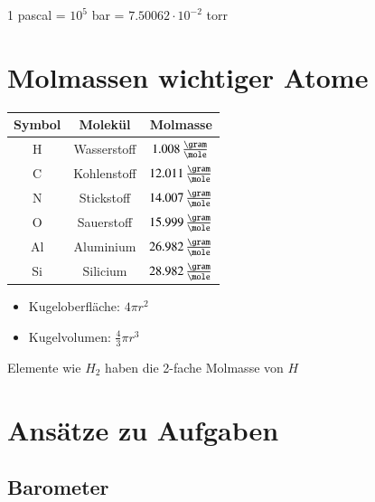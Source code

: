 1 pascal = $10^5$ bar = $7.50062 \cdot 10^{-2}$ torr

\section{Molmassen wichtiger Atome}
\begin{minipage}{0.5\columnwidth}
    \renewcommand{\arraystretch}{1.3}
    \begin{tabular}{c | c | c }
        \textbf{Symbol} & \textbf{Molekül}  & \textbf{Molmasse}                 \\
        \hline
        H               & Wasserstoff       & $1.008 \, \frac{\gram}{\mole}$    \\
        C               & Kohlenstoff       & $12.011 \, \frac{\gram}{\mole}$   \\
        N               & Stickstoff        & $14.007 \, \frac{\gram}{\mole}$   \\
        O               & Sauerstoff        & $15.999 \, \frac{\gram}{\mole}$   \\
        Al              & Aluminium         & $26.982 \, \frac{\gram}{\mole}$   \\
        Si              & Silicium          & $28.982 \, \frac{\gram}{\mole}$   \\
    \end{tabular}\smallbreak
\end{minipage}\hfill
\begin{minipage}[b]{0.49\columnwidth}
    \begin{itemize}
        \item Kugeloberfläche: $4\pi r^2$
        \item Kugelvolumen: $\frac{4}{3} \pi r^3$
    \end{itemize}
\end{minipage}

Elemente wie $H_2$ haben die 2-fache Molmasse von $H$
\renewcommand{\arraystretch}{1}

\section{Ansätze zu Aufgaben}

\subsection{Barometer}

